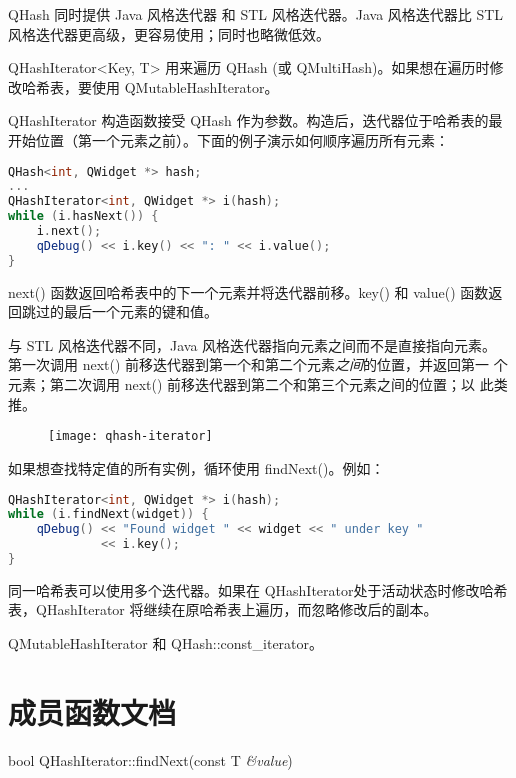 QHash 同时提供 Java 风格迭代器 和 STL 风格迭代器。Java 风格迭代器比 STL 风格迭代器更高级，更容易使用；同时也略微低效。

QHashIterator<Key, T> 用来遍历 QHash (或 QMultiHash)。如果想在遍历时修改哈希表，要使用 QMutableHashIterator。

QHashIterator 构造函数接受 QHash 作为参数。构造后，迭代器位于哈希表的最开始位置（第一个元素之前）。下面的例子演示如何顺序遍历所有元素：

\begin{lstlisting}[language=C++]
QHash<int, QWidget *> hash;
...
QHashIterator<int, QWidget *> i(hash);
while (i.hasNext()) {
    i.next();
    qDebug() << i.key() << ": " << i.value();
}
\end{lstlisting}

next() 函数返回哈希表中的下一个元素并将迭代器前移。key() 和 value() 函数返回跳过的最后一个元素的键和值。

与 STL 风格迭代器不同，Java 风格迭代器指向元素之间而不是直接指向元素。
第一次调用 next() 前移迭代器到第一个和第二个元素\emph{之间}的位置，并返回第一
个元素；第二次调用 next() 前移迭代器到第二个和第三个元素之间的位置；以
此类推。


\begin{figure}[hbt!]  
	\centering
    \texttt{[image: qhash-iterator]}
\end{figure}

如果想查找特定值的所有实例，循环使用 findNext()。例如：

\begin{lstlisting}[language=C++]
QHashIterator<int, QWidget *> i(hash);
while (i.findNext(widget)) {
    qDebug() << "Found widget " << widget << " under key "
             << i.key();
}
\end{lstlisting}

同一哈希表可以使用多个迭代器。如果在 QHashIterator处于活动状态时修改哈希表，QHashIterator 将继续在原哈希表上遍历，而忽略修改后的副本。


\begin{notice}[另请参阅]
QMutableHashIterator 和 QHash::const\_iterator。
\end{notice}

\splitLine

\section{成员函数文档}

bool QHashIterator::findNext(const T \emph{\&value})

